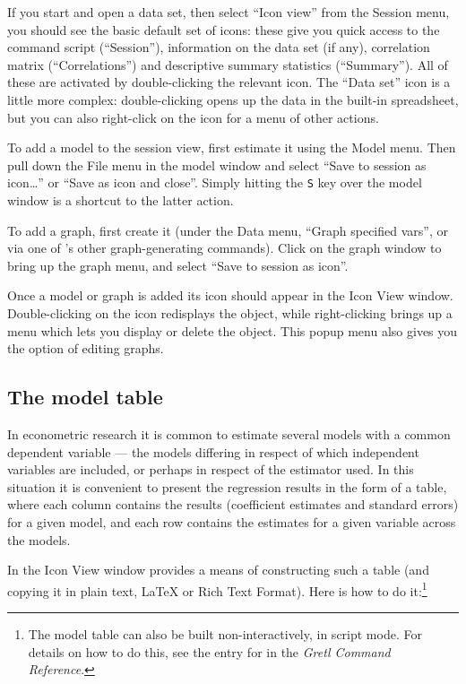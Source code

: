 If you start  and open a data set, then select ``Icon
view'' from the Session menu, you should see the basic default set of
icons: these give you quick access to the command script
(``Session''), information on the data set (if any), correlation
matrix (``Correlations'') and descriptive summary statistics
(``Summary''). All of these are activated by double-clicking the
relevant icon.  The ``Data set'' icon is a little more complex:
double-clicking opens up the data in the built-in spreadsheet, but you
can also right-click on the icon for a menu of other actions.

To add a model to the session view, first estimate it using the Model
menu.  Then pull down the File menu in the model window and select
``Save to session as icon\dots{}'' or ``Save as icon and close''.
Simply hitting the \verb+S+ key over the model window is a shortcut to
the latter action.

To add a graph, first create it (under the Data menu, ``Graph
specified vars'', or via one of 's other graph-generating
commands).  Click on the graph window to bring up the graph menu, and
select ``Save to session as icon''.

Once a model or graph is added its icon should appear in the Icon View
window.  Double-clicking on the icon redisplays the object, while
right-clicking brings up a menu which lets you display or delete the
object.  This popup menu also gives you the option of editing graphs.

\subsection{The model table}
\label{model-table}

In econometric research it is common to estimate several models with a
common dependent variable --- the models differing in respect of which
independent variables are included, or perhaps in respect of the
estimator used.  In this situation it is convenient to present the
regression results in the form of a table, where each column contains
the results (coefficient estimates and standard errors) for a given
model, and each row contains the estimates for a given variable across
the models.  

In the Icon View window  provides a means of constructing
such a table (and copying it in plain text, {\LaTeX} or Rich Text
Format).  Here is how to do it:\footnote{The model table can also be
  built non-interactively, in script mode.  For details on how to do
  this, see the entry for  in the \emph{Gretl Command
    Reference}.  }
      
